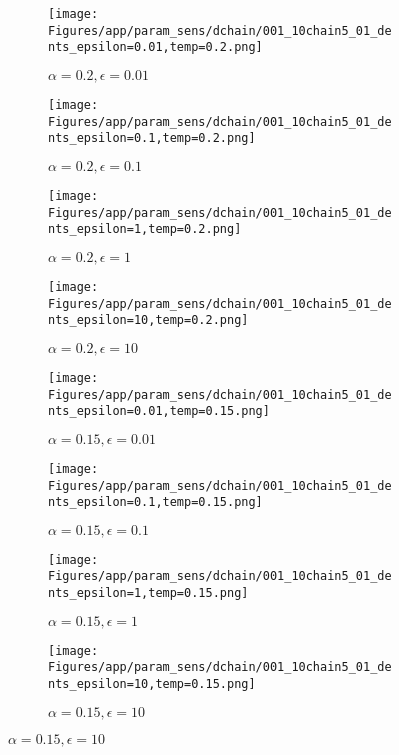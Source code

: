 \documentclass{article}
\theoremstyle{plain}
\begin{document}
\begin{appendices}
\begin{figure}
                \begin{subfigure}[b]{0.24\textwidth}
                    \centering
                    \texttt{[image: Figures/app/param\_sens/dchain/001\_10chain5\_01\_dents\_epsilon=0.01,temp=0.2.png]}
                    \caption*{$\alpha=0.2,\epsilon=0.01$}
                \end{subfigure}
                \begin{subfigure}[b]{0.24\textwidth}
                    \centering
                    \texttt{[image: Figures/app/param\_sens/dchain/001\_10chain5\_01\_dents\_epsilon=0.1,temp=0.2.png]}
                    \caption*{$\alpha=0.2,\epsilon=0.1$}
                \end{subfigure}
                \begin{subfigure}[b]{0.24\textwidth}
                    \centering
                    \texttt{[image: Figures/app/param\_sens/dchain/001\_10chain5\_01\_dents\_epsilon=1,temp=0.2.png]}
                    \caption*{$\alpha=0.2,\epsilon=1$}
                \end{subfigure}
                \begin{subfigure}[b]{0.24\textwidth}
                    \centering
                    \texttt{[image: Figures/app/param\_sens/dchain/001\_10chain5\_01\_dents\_epsilon=10,temp=0.2.png]}
                    \caption*{$\alpha=0.2,\epsilon=10$}
                \end{subfigure}
                
                \begin{subfigure}[b]{0.24\textwidth}
                    \centering
                    \texttt{[image: Figures/app/param\_sens/dchain/001\_10chain5\_01\_dents\_epsilon=0.01,temp=0.15.png]}
                    \caption*{$\alpha=0.15,\epsilon=0.01$}
                \end{subfigure}
                \begin{subfigure}[b]{0.24\textwidth}
                    \centering
                    \texttt{[image: Figures/app/param\_sens/dchain/001\_10chain5\_01\_dents\_epsilon=0.1,temp=0.15.png]}
                    \caption*{$\alpha=0.15,\epsilon=0.1$}
                \end{subfigure}
                \begin{subfigure}[b]{0.24\textwidth}
                    \centering
                    \texttt{[image: Figures/app/param\_sens/dchain/001\_10chain5\_01\_dents\_epsilon=1,temp=0.15.png]}
                    \caption*{$\alpha=0.15,\epsilon=1$}
                \end{subfigure}
                \begin{subfigure}[b]{0.24\textwidth}
                    \centering
                    \texttt{[image: Figures/app/param\_sens/dchain/001\_10chain5\_01\_dents\_epsilon=10,temp=0.15.png]}
                    \caption*{$\alpha=0.15,\epsilon=10$}
                \end{subfigure}
                

\end{figure}
\end{appendices}
\end{document}
